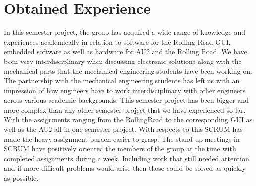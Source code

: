 \chapter{Obtained Experience}
In this semester project, the group has acquired a wide range of knowledge and experiences academically in relation to software for the Rolling Road GUI, embedded software as well as hardware for AU2 and the Rolling Road. We have been very interdisciplinary when discussing electronic solutions along with the mechanical parts that the mechanical engineering students have been working on. The partnership with the mechanical engineering students has left us with an impression of how engineers have to work interdisciplinary with other engineers across various academic backgrounds. This semester project has been bigger and more complex than any other semester project that we have experienced so far. With the assignments ranging from the RollingRoad to the corresponding GUI as well as the AU2 all in one semester project. With respects to this SCRUM has made the heavy assignment burden easier to grasp. The stand-up meetings in SCRUM have positively oriented the members of the group at the time with completed assignments during a week. Including work that still needed attention and if more difficult problems would arise then those could be solved as quickly as possible.






